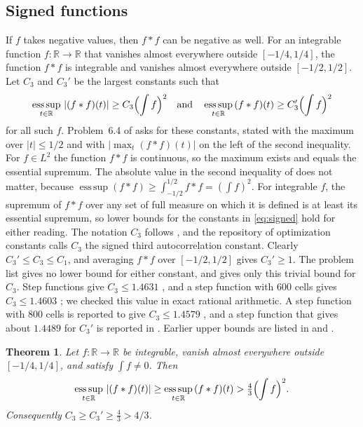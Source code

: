 \documentclass[11pt]{amsart}
\newtheorem{theorem}{Theorem}[section]
\theoremstyle{definition}
\theoremstyle{remark}
\numberwithin{equation}{section}
\newcommand{\R}{\mathbb{R}}
\newcommand{\esssup}{\operatorname*{ess\,sup}}
\newcommand{\CthrPFrac}{\tfrac43}
\newcommand{\CthrPDec}{4/3}
\begin{document}
\subsection*{Signed functions}
If $f$ takes negative values, then $f*f$ can be negative as well. For an integrable function $f\colon\R\to\R$ that vanishes almost everywhere outside $[-1/4,1/4]$, the function $f*f$ is integrable and vanishes almost everywhere outside $[-1/2,1/2]$. Let $C_3$ and $C_3'$ be the largest constants such that
\begin{equation}\label{eq:signed}
\esssup_{t\in\R}\,|(f*f)(t)|\ge C_3\Bigl(\int f\Bigr)^2\quad\text{and}\quad\esssup_{t\in\R}\,(f*f)(t)\ge C_3'\Bigl(\int f\Bigr)^2
\end{equation}
for all such $f$. Problem~6.4 of \cite{GGTW25} asks for these constants, stated with the maximum over $|t|\le1/2$ and with $|\max_t(f*f)(t)|$ on the left of the second inequality. For $f\in L^2$ the function $f*f$ is continuous, so the maximum exists and equals the essential supremum. The absolute value in the second inequality of \cite{GGTW25} does not matter, because $\esssup(f*f)\ge\int_{-1/2}^{1/2}f*f=(\int f)^2$. For integrable $f$, the supremum of $f*f$ over any set of full measure on which it is defined is at least its essential supremum, so lower bounds for the constants in \eqref{eq:signed} hold for either reading. The notation $C_3$ follows \cite{AE25}, and the repository of optimization constants \cite{OC26} calls $C_3$ the signed third autocorrelation constant. Clearly $C_3'\le C_3\le C_1$, and averaging $f*f$ over $[-1/2,1/2]$ gives $C_3'\ge1$. The problem list \cite{GGTW25} gives no lower bound for either constant, and \cite{OC26} gives only this trivial bound for $C_3$. Step functions give $C_3\le1.4631$ \cite{OC26}, and a step function with $600$ cells gives $C_3\le1.4603$ \cite{Ger26}; we checked this value in exact rational arithmetic. A step function with $800$ cells is reported to give $C_3\le1.4579$ \cite{KKHL26}, and a step function that gives about $1.4489$ for $C_3'$ is reported in \cite{Jana26}. Earlier upper bounds are listed in \cite{GGTW25} and \cite[Table~1 and Appendix~A.5]{BKPZ26}.

\begin{theorem}\label{thm:signed}
Let $f\colon\R\to\R$ be integrable, vanish almost everywhere outside $[-1/4,1/4]$, and satisfy $\int f\neq0$. Then
\[
\esssup_{t\in\R}\,|(f*f)(t)|\ge\esssup_{t\in\R}\,(f*f)(t)>\CthrPFrac\Bigl(\int f\Bigr)^2.
\]
Consequently $C_3\ge C_3'\ge\CthrPFrac>\CthrPDec$.
\end{theorem}
\end{document}
